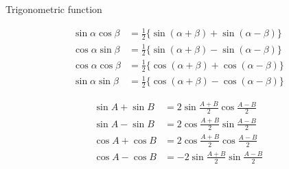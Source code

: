 \documentclass[9pt]{beamer}
\begin{document}
\begin{section}{Trigonometric function}
\begin{frame}
            \begin{align*}  \sin \alpha \cos \beta &= \frac{1}{2} \{ \sin(\alpha + \beta) + \sin(\alpha - \beta)\} \\ \cos \alpha \sin \beta &= \frac{1}{2} \{ \sin(\alpha + \beta) - \sin(\alpha - \beta)\}\\ \cos \alpha \cos \beta &= \frac{1}{2} \{ \cos(\alpha + \beta) + \cos(\alpha - \beta)\}\\ \sin \alpha \sin \beta &= \frac{1}{2} \{ \cos(\alpha + \beta) - \cos(\alpha - \beta)\}\end{align*}

            \begin{align*}  \sin A + \sin B &= 2\sin\frac{A+B}{2}  \cos \frac{A-B}{2}\\  \sin A - \sin B &= 2\cos\frac{A+B}{2}  \sin \frac{A-B}{2}\\  \cos A + \cos B &= 2\cos\frac{A+B}{2}  \cos \frac{A-B}{2}\\ \cos A - \cos B &= - 2\sin\frac{A+B}{2}  \sin \frac{A-B}{2}\end{align*}
                
            
        
        \end{frame}
    \end{section}
\end{document}
